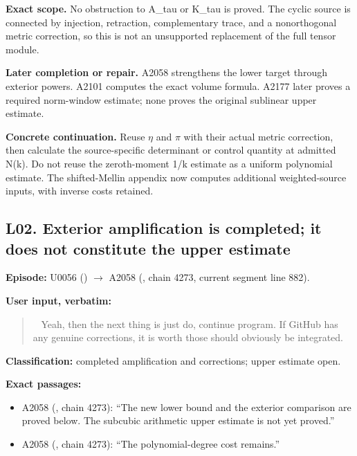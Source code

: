 \documentclass[10pt,a4paper,oneside]{report}
\providecommand{\tightlist}{\setlength{\itemsep}{0pt}\setlength{\parskip}{0pt}}
\begin{document}
\textbf{Exact scope.} No obstruction to A\_tau or K\_tau is proved. The
cyclic source is connected by injection, retraction, complementary
trace, and a nonorthogonal metric correction, so this is not an
unsupported replacement of the full tensor module.

\textbf{Later completion or repair.} A2058 strengthens the lower target
through exterior powers. A2101 computes the exact volume formula. A2177
later proves a required norm-window estimate; none proves the original
sublinear upper estimate.

\textbf{Concrete continuation.} Reuse
\allowbreak{}\ensuremath{η}\allowbreak{} and
\allowbreak{}\ensuremath{π}\allowbreak{} with their actual metric
correction, then calculate the source-specific determinant or control
quantity at admitted N(k). Do not reuse the zeroth-moment 1/k estimate
as a uniform polynomial estimate. The shifted-Mellin appendix now
computes additional weighted-source inputs, with inverse costs retained.

\subsection{L02. Exterior amplification is completed; it does not
constitute the upper
estimate}\label{l02.-exterior-amplification-is-completed-it-does-not-constitute-the-upper-estimate}

\textbf{Episode:} U0056
(\protect{})
\allowbreak{}\ensuremath{→}\allowbreak{} A2058
(\protect{}, chain 4273,
current segment line 882).

\textbf{User input, verbatim:}

\begin{quote}
~ Yeah, then the next thing is just do, continue program. If GitHub has
any genuine corrections, it is worth those should obviously be
integrated.
\end{quote}

\textbf{Classification:} completed amplification and corrections; upper
estimate open.

\textbf{Exact passages:}

\begin{itemize}
\tightlist
\item
  A2058 (\protect{}, chain
  4273): ``The new lower bound and the exterior comparison are proved
  below. The subcubic arithmetic upper estimate is not yet proved.''
\item
  A2058 (\protect{}, chain
  4273): ``The polynomial-degree cost remains.''
\end{itemize}
\end{document}
